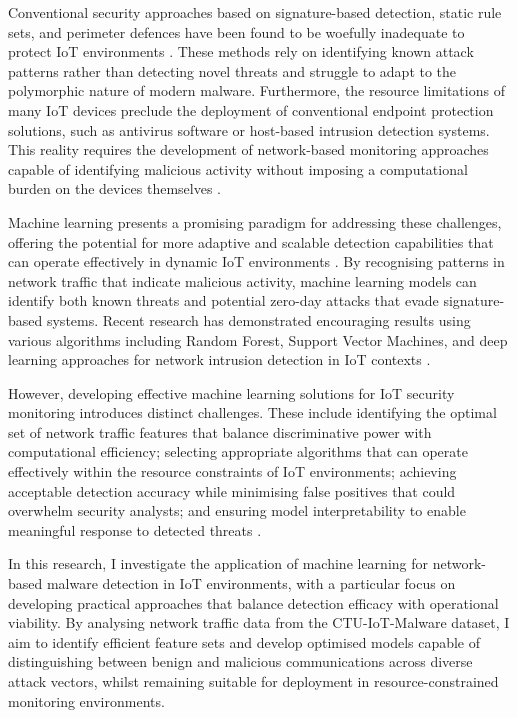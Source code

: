 Conventional security approaches based on signature-based detection, static rule sets, and perimeter defences have been found to be woefully inadequate to protect IoT environments \citep{Nguyen2019}. These methods rely on identifying known attack patterns rather than detecting novel threats and struggle to adapt to the polymorphic nature of modern malware. Furthermore, the resource limitations of many IoT devices preclude the deployment of conventional endpoint protection solutions, such as antivirus software or host-based intrusion detection systems. This reality requires the development of network-based monitoring approaches capable of identifying malicious activity without imposing a computational burden on the devices themselves \citep{Diro2018}.

Machine learning presents a promising paradigm for addressing these challenges, offering the potential for more adaptive and scalable detection capabilities that can operate effectively in dynamic IoT environments \citep{Buczak2016}. By recognising patterns in network traffic that indicate malicious activity, machine learning models can identify both known threats and potential zero-day attacks that evade signature-based systems. Recent research has demonstrated encouraging results using various algorithms including Random Forest, Support Vector Machines, and deep learning approaches for network intrusion detection in IoT contexts \citep{Aldweesh2020, Diro2021}.

However, developing effective machine learning solutions for IoT security monitoring introduces distinct challenges. These include identifying the optimal set of network traffic features that balance discriminative power with computational efficiency; selecting appropriate algorithms that can operate effectively within the resource constraints of IoT environments; achieving acceptable detection accuracy while minimising false positives that could overwhelm security analysts; and ensuring model interpretability to enable meaningful response to detected threats \citep{Vinayakumar2019, baich2022machine, saran2023comparative}.

In this research, I investigate the application of machine learning for network-based malware detection in IoT environments, with a particular focus on developing practical approaches that balance detection efficacy with operational viability. By analysing network traffic data from the CTU-IoT-Malware dataset, I aim to identify efficient feature sets and develop optimised models capable of distinguishing between benign and malicious communications across diverse attack vectors, whilst remaining suitable for deployment in resource-constrained monitoring environments.

